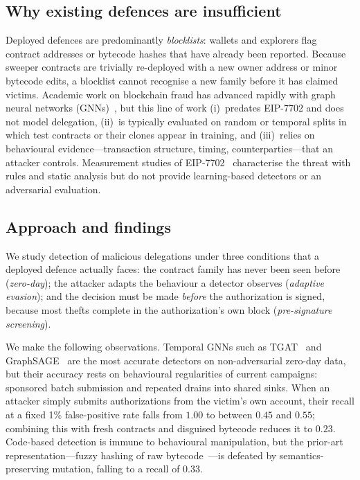 \documentclass[journal]{IEEEtran}
\begin{document}
\subsection{Why existing defences are insufficient}
Deployed defences are predominantly \emph{blocklists}: wallets and explorers flag contract addresses or bytecode hashes that have already been reported. Because sweeper contracts are trivially re-deployed with a new owner address or minor bytecode edits, a blocklist cannot recognise a new family before it has claimed victims. Academic work on blockchain fraud has advanced rapidly with graph neural networks (GNNs)~\cite{weber2019aml,wu2022phishers,li2022ttagn}, but this line of work (i)~predates EIP-7702 and does not model delegation, (ii)~is typically evaluated on random or temporal splits in which test contracts or their clones appear in training, and (iii)~relies on behavioural evidence---transaction structure, timing, counterparties---that an attacker controls. Measurement studies of EIP-7702~\cite{qi2025eip7702phishing,wintermute2025,huang2026eip7702} characterise the threat with rules and static analysis but do not provide learning-based detectors or an adversarial evaluation.

\subsection{Approach and findings}
We study detection of malicious delegations under three conditions that a deployed defence actually faces: the contract family has never been seen before (\emph{zero-day}); the attacker adapts the behaviour a detector observes (\emph{adaptive evasion}); and the decision must be made \emph{before} the authorization is signed, because most thefts complete in the authorization's own block (\emph{pre-signature screening}).

We make the following observations. Temporal GNNs such as TGAT~\cite{xu2020tgat} and GraphSAGE~\cite{hamilton2017graphsage} are the most accurate detectors on non-adversarial zero-day data, but their accuracy rests on behavioural regularities of current campaigns: sponsored batch submission and repeated drains into shared sinks. When an attacker simply submits authorizations from the victim's own account, their recall at a fixed 1\% false-positive rate falls from $1.00$ to between $0.45$ and $0.55$; combining this with fresh contracts and disguised bytecode reduces it to $0.23$. Code-based detection is immune to behavioural manipulation, but the prior-art representation---fuzzy hashing of raw bytecode~\cite{kornblum2006ssdeep}---is defeated by semantics-preserving mutation, falling to a recall of $0.33$.
\end{document}
